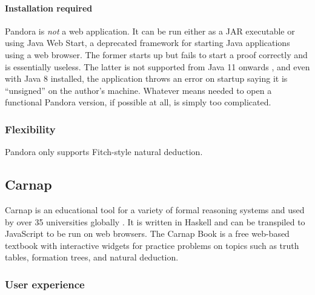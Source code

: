 \paragraph{Installation required}
Pandora is \textit{not} a web application. It can be run either as a JAR executable or using Java Web Start, a deprecated framework for starting Java applications using a web browser. The former starts up but fails to start a proof correctly and is essentially useless. The latter is not supported from Java 11 onwards \cite{oracle:2020}, and even with Java 8 installed, the application throws an error on startup saying it is ``unsigned'' on the author's machine. Whatever means needed to open a functional Pandora version, if possible at all, is simply too complicated.

\subsubsection{Flexibility}
Pandora only supports Fitch-style natural deduction.

\subsection{Carnap}
Carnap \cite{carnap, carnap:2018} is an educational tool for a variety of formal reasoning systems and used by over 35 universities globally \cite{carnap:about}. It is written in Haskell and can be transpiled to JavaScript to be run on web browsers. The Carnap Book \cite{carnap:book} is a free web-based textbook with interactive widgets for practice problems on topics such as truth tables, formation trees, and natural deduction.

\subsubsection{User experience}

